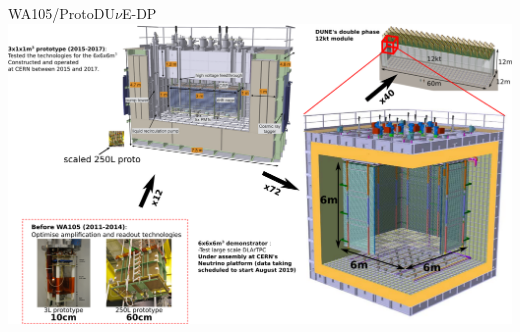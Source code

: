 \documentclass[10pt]{beamer}
\begin{document}
    
    \begin{frame}{WA105/\texorpdfstring{ProtoDU$\nu$E}{ProtoDUNE}-DP}
		\includegraphics[width=1.05\linewidth]{figures/contexte/wa105_scale.png}
		
    \end{frame}
    
\end{document}
